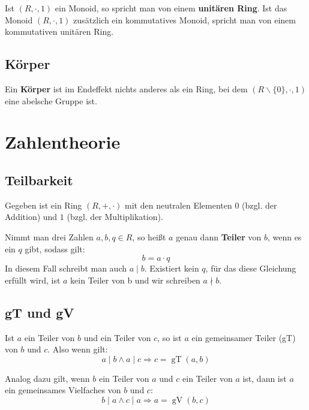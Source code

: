 \documentclass[11pt]{article}
\begin{document}
Ist $(R, \cdot, 1)$ ein Monoid, so spricht man von einem \textbf{unitären Ring}.
Ist das Monoid $(R, \cdot, 1)$ zusätzlich ein kommutatives Monoid, spricht man von einem kommutativen unitären Ring.

\subsection{Körper}
Ein \textbf{Körper} ist im Endeffekt nichts anderes als ein Ring, bei dem $(R\backslash\{0\}, \cdot, 1)$ eine abelsche
Gruppe ist.

\section{Zahlentheorie}
\subsection{Teilbarkeit}
\begin{definition}
  Gegeben ist ein Ring $(R, +, \cdot)$ mit den neutralen Elementen $0$ (bzgl. der Addition) und $1$ (bzgl. der Multiplikation).

  Nimmt man drei Zahlen $a, b, q \in R$, so heißt $a$ genau dann \textbf{Teiler} von $b$, wenn es ein $q$ gibt, sodass gilt:
  \[
    b = a \cdot q
  \]
  In diesem Fall schreibt man auch $a \mid b$. Existiert kein $q$, für das diese Gleichung erfüllt wird, ist $a$ kein Teiler
  von b und wir schreiben $a \nmid b$.
\end{definition}

\subsection{gT und gV}
Ist $a$ ein Teiler von $b$ und ein Teiler von $c$, so ist $a$ ein gemeinsamer Teiler (gT) von $b$ und $c$.
Also wenn gilt:
\[
  a \mid b \land a \mid c \Longrightarrow c = \operatorname{gT}(a,b)
\]

Analog dazu gilt, wenn $b$ ein Teiler von $a$ und $c$ ein Teiler von $a$ ist, dann ist $a$ ein gemeinsames Vielfaches von
$b$ und $c$:
\[
  b \mid a \land c \mid a \Longrightarrow a = \operatorname{gV}(b,c)
\]
\end{document}
